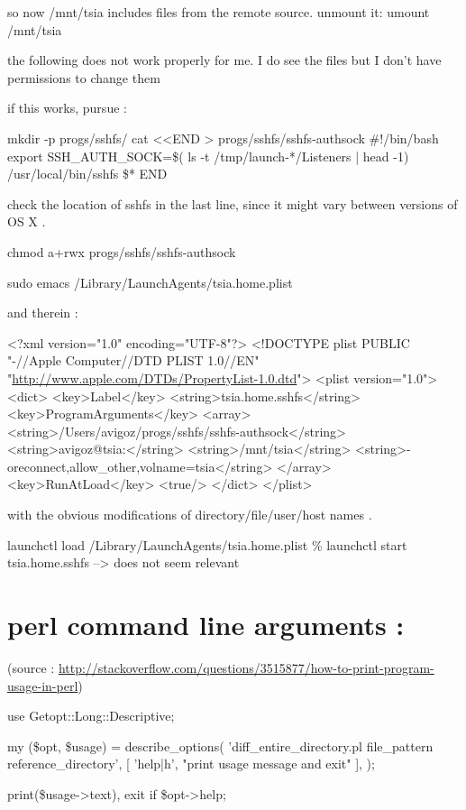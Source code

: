 \documentclass[11pt]{article}
\begin{document}
so now /mnt/tsia includes files from the remote source.  unmount it:
umount /mnt/tsia


the following does not work properly for me. I do see the files but I don't have permissions to change them

if this works, pursue : 

mkdir -p progs/sshfs/
cat <<END > progs/sshfs/sshfs-authsock
\#!/bin/bash
export SSH\_AUTH\_SOCK=\$( ls -t /tmp/launch-*/Listeners | head -1)
/usr/local/bin/sshfs \$*
END

check the location of sshfs in the last line, since it might vary between versions of OS X .

chmod a+rwx progs/sshfs/sshfs-authsock

sudo emacs   /Library/LaunchAgents/tsia.home.plist  

and therein : 

<?xml version="1.0" encoding="UTF-8"?>
<!DOCTYPE plist PUBLIC "-//Apple Computer//DTD PLIST 1.0//EN" "\url{http://www.apple.com/DTDs/PropertyList-1.0.dtd}">
<plist version="1.0">
<dict>
        <key>Label</key>
        <string>tsia.home.sshfs</string>
        <key>ProgramArguments</key>
        <array>
                <string>/Users/avigoz/progs/sshfs/sshfs-authsock</string>
                <string>avigoz@tsia:</string>
                <string>/mnt/tsia</string>
                <string>-oreconnect,allow\_other,volname=tsia</string>
        </array>
        <key>RunAtLoad</key>
        <true/>
</dict>
</plist>


with the obvious modifications of directory/file/user/host names . 

launchctl load /Library/LaunchAgents/tsia.home.plist
\% launchctl start tsia.home.sshfs --> does not seem relevant


\section{perl command line arguments :}
\label{sec-35}

(source : \url{http://stackoverflow.com/questions/3515877/how-to-print-program-usage-in-perl})

use Getopt::Long::Descriptive;

my (\$opt, \$usage) = describe\_options(
    'diff\_entire\_directory.pl file\_pattern reference\_directory',
    [ 'help|h',       "print usage message and exit" ],
);

print(\$usage->text), exit if \$opt->help;
\end{document}
